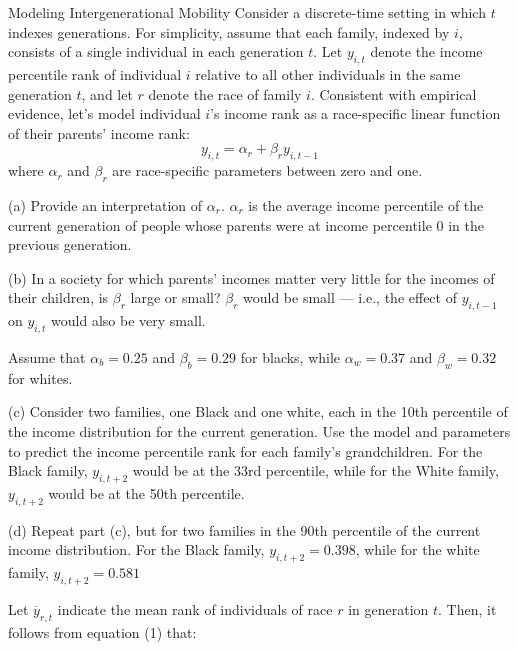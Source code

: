 \documentclass[10pt]{extarticle}
\begin{document}
  \begin{problem}{Modeling Intergenerational Mobility}
    Consider a discrete-time setting in which $t$ indexes generations. For simplicity, assume that each family, indexed by $i$, consists of a single individual in each generation $t$. Let $y_{i,t}$ denote the income percentile rank of individual $i$ relative to all other individuals in the same generation $t$, and let $r$ denote the race of family $i$. Consistent with empirical evidence, let's model individual $i$'s income rank as a race-specific linear function of their parents' income rank:
    \begin{equation}
      y_{i,t} = \alpha_r + \beta_r y_{i,t-1}
    \end{equation}
    where $\alpha_r$ and $\beta_r$ are race-specific parameters between zero and one.
    \begin{problem}{(a)}
      Provide an interpretation of $\alpha_r$.
      \tcblower
      $\alpha_r$ is the average income percentile of the current generation of people whose parents were at income percentile $0$ in the previous generation.
    \end{problem}
    \begin{problem}{(b)}
      In a society for which parents' incomes matter very little for the incomes of their children, is $\beta_r$ large or small?
      \tcblower
      $\beta_r$ would be small --- i.e., the effect of $y_{i,t-1}$ on $y_{i,t}$ would also be very small.
    \end{problem}
    Assume that $\alpha_b = 0.25$ and $\beta_b = 0.29$ for blacks, while $\alpha_w = 0.37$ and $\beta_w = 0.32$ for whites.
    \begin{problem}{(c)}
      Consider two families, one Black and one white, each in the 10th percentile of the income distribution for the current generation. Use the model and parameters to predict the income percentile rank for each family's grandchildren.
      \tcblower
      For the Black family, $y_{i,t+2}$ would be at the 33rd percentile, while for the White family, $y_{i,t+2}$ would be at the 50th percentile.
    \end{problem}
    \begin{problem}{(d)}
      Repeat part (c), but for two families in the 90th percentile of the current income distribution.
      \tcblower
      For the Black family, $y_{i,t+2} = 0.398$, while for the white family, $y_{i,t+2} = 0.581$
    \end{problem}
    Let $\overline{y}_{r,t}$ indicate the mean rank of individuals of race $r$ in generation $t$. Then, it follows from equation (1) that:

\end{problem}
\end{document}
